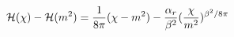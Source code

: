 \begin{equation}
{\cal{H}}(\chi)-{\cal{H}}(m^2)= {1 \over 8 \pi} (\chi - m^2)
- {\alpha_r \over \beta^2} ({\chi \over m^2})^{\beta^2 / 8 \pi}
\end{equation}

